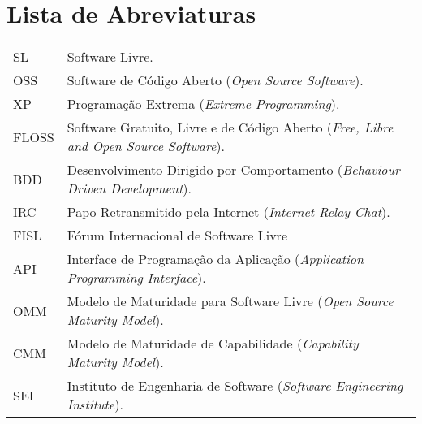 \documentclass[11pt,twoside,a4paper]{book}
\begin{document}
\chapter{Lista de Abreviaturas}
\begin{tabular}{ll}
  SL       & Software Livre.\\
  OSS         & Software de Código Aberto (\emph{Open Source
    Software}).\\
  XP       & Programação Extrema (\emph{Extreme Programming}).\\
  FLOSS       & Software Gratuito, Livre e de Código Aberto
  (\emph{Free, Libre and Open Source Software}).\\
  BDD       & Desenvolvimento Dirigido por Comportamento
  (\emph{Behaviour Driven Development}).\\
  IRC       & Papo Retransmitido pela Internet (\emph{Internet Relay
    Chat}).\\
  FISL       & Fórum Internacional de Software Livre\\
  API       & Interface de Programação da Aplicação (\emph{Application
    Programming Interface}).\\
  OMM       & Modelo de Maturidade para Software Livre (\emph{Open
    Source Maturity Model}).\\
  CMM       & Modelo de Maturidade de Capabilidade (\emph{Capability
    Maturity Model}).\\
  SEI       & Instituto de Engenharia de Software (\emph{Software
    Engineering Institute}).\\
\end{tabular}


\listoffigures %

\mainmatter
\fancyhead[RE,LO]{\thesection}

\onehalfspacing %
\end{document}
